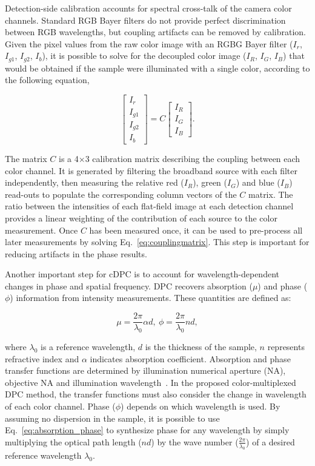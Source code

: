 Detection-side calibration accounts for spectral cross-talk of the camera color channels. Standard RGB Bayer filters do not provide perfect discrimination between RGB wavelengths, but coupling artifacts can be removed by calibration. Given the pixel values from the raw color image with an RGBG Bayer filter ($I_r$, $I_{g1}$, $I_{g2}$, $I_b$), it is possible to solve for the decoupled color image ($I_R$, $I_{G}$, $I_{B}$) that would be obtained if the sample were illuminated with a single color, according to the following equation,

\begin{equation}
\label{eq:couplingmatrix}
\begin{bmatrix}
I_{r} \\
I_{g1}\\
I_{g2}\\
I_{b}
\end{bmatrix}
 =
 C
 \begin{bmatrix}
I_{R} \\
I_{G}\\
I_{B}
\end{bmatrix}.
\end{equation}

\noindent  The matrix $C$ is a 4$\times$3 calibration matrix describing the coupling between each color channel. It is generated by filtering the broadband source with each filter independently, then measuring the relative red ($I_R$), green ($I_G$) and blue ($I_B$) read-outs to populate the corresponding column vectors of the $C$ matrix. The ratio between the intensities of each flat-field image at each detection channel provides a linear weighting of the contribution of each source to the color measurement. Once $C$ has been measured once, it can be used to pre-process all later measurements by solving Eq.~\eqref{eq:couplingmatrix}. This step is important for reducing artifacts in the phase results.

Another important step for cDPC is to account for wavelength-dependent changes in phase and spatial frequency. DPC recovers absorption ($\mu$) and phase ($\phi$) information from intensity measurements. These quantities are defined as:

\begin{equation}
\label{eq:absorption_phase}
\mu = \frac{2\pi}{\lambda_0} \alpha d,\ \phi = \frac{2\pi}{\lambda_0} n d,
\end{equation}

\noindent where $\lambda_0$ is a reference wavelength, $d$ is the thickness of the sample, $n$ represents refractive index and $\alpha$ indicates absorption coefficient. Absorption and phase transfer functions are determined by illumination numerical aperture (NA), objective NA and illumination wavelength~\cite{tian2015quantitative}. In the proposed color-multiplexed DPC method, the transfer functions must also consider the change in wavelength of each color channel. Phase ($\phi$) depends on which wavelength is used. By assuming no dispersion in the sample, it is possible to use Eq.~\eqref{eq:absorption_phase} to synthesize phase for any wavelength by simply multiplying the optical path length ($nd$) by the wave number ($\frac{2\pi}{\lambda_0}$) of a desired reference wavelength $\lambda_0$.

